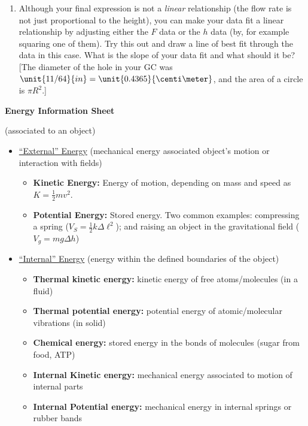 \documentclass[12pt]{article}
\begin{document}
\begin{enumerate}
\begin{enumerate}
	\item Although your final expression is not a {\em linear} relationship (the flow rate is  not just proportional to the height), you can make your data fit a linear relationship by adjusting either the $F$ data or the $h$ data (by, for example squaring one of them).   Try this out and draw a line of best fit through the data in this case.  What is the slope of your data fit and what should it be?  [The diameter of the hole in your GC was $\unit{11/64}{in} = \unit{0.4365}{\centi\meter}$, and the area of a circle is $\pi R^2$.]
	\end{enumerate}

\end{enumerate}



\newpage

\begin{center}
{\bf \large Energy Information Sheet}
\end{center}

 (associated to an object)
	\begin{itemize}
	\item[] \underline{``External'' Energy} (mechanical energy associated object's motion or interaction with fields)
		\begin{itemize}
		\renewcommand{\labelitemii}{\textbullet}
		\item {\bf Kinetic Energy:} Energy of motion, depending on mass and speed as $K = \frac{1}{2} m v^2$.
		\item {\bf Potential Energy:} Stored energy. Two common examples: compressing a spring ($V_S = \frac{1}{2} k \Delta \ell^2$); and raising an object in the  gravitational field ($V_g = m g \Delta h$)
		\end{itemize}
	\item[] \underline{``Internal'' Energy} (energy within the defined boundaries of the object)
		\begin{itemize}
		\renewcommand{\labelitemii}{\textbullet}
		\item {\bf Thermal kinetic energy:} kinetic energy of free atoms/molecules (in a fluid)
		\item {\bf Thermal potential energy:}  potential energy of atomic/molecular vibrations (in solid)
		\item {\bf Chemical energy:} stored energy in the bonds of molecules (sugar from food, ATP)
		\item {\bf Internal Kinetic energy:} mechanical energy associated to motion of internal parts
		\item {\bf Internal Potential energy:} mechanical energy in internal springs or rubber bands 
		\end{itemize}
	\end{itemize}
\end{document}
